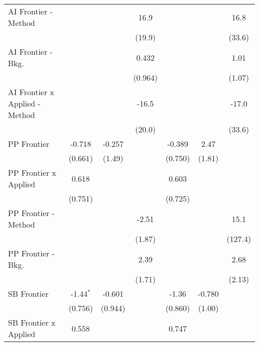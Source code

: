 \begin{tabular}{lcccccc}
   AI Frontier - Method           &              &             & 16.9         &              &         & 16.8\\   
                                  &              &             & (19.9)       &              &         & (33.6)\\   
   AI Frontier - Bkg.             &              &             & 0.432        &              &         & 1.01\\   
                                  &              &             & (0.964)      &              &         & (1.07)\\   
   AI Frontier x Applied - Method &              &             & -16.5        &              &         & -17.0\\   
                                  &              &             & (20.0)       &              &         & (33.6)\\   
   PP Frontier                    & -0.718       & -0.257      &              & -0.389       & 2.47    &   \\   
                                  & (0.661)      & (1.49)      &              & (0.750)      & (1.81)  &   \\   
   PP Frontier x Applied          & 0.618        &             &              & 0.603        &         &   \\   
                                  & (0.751)      &             &              & (0.725)      &         &   \\   
   PP Frontier - Method           &              &             & -2.51        &              &         & 15.1\\   
                                  &              &             & (1.87)       &              &         & (127.4)\\   
   PP Frontier - Bkg.             &              &             & 2.39         &              &         & 2.68\\   
                                  &              &             & (1.71)       &              &         & (2.13)\\   
   SB Frontier                    & -1.44$^{*}$  & -0.601      &              & -1.36        & -0.780  &   \\   
                                  & (0.756)      & (0.944)     &              & (0.860)      & (1.00)  &   \\   
   SB Frontier x Applied          & 0.558        &             &              & 0.747        &         &   \\   

\end{tabular}
